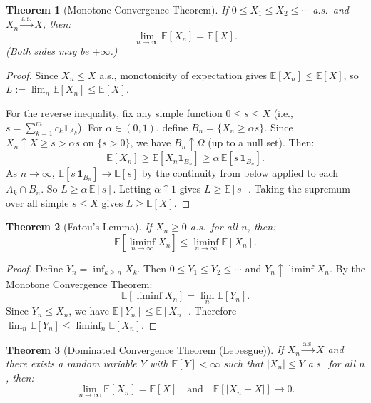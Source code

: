 \documentclass[11pt,a4paper]{article}
\theoremstyle{definition}
\theoremstyle{plain}
\newtheorem{theorem}{Theorem}[section]
\theoremstyle{remark}
\newcommand{\E}{\mathbb{E}}
\newcommand{\indicator}{\mathbf{1}}
\newcommand{\cas}{\xrightarrow{\text{a.s.}}}
\begin{document}
\begin{theorem}[Monotone Convergence Theorem]
\label{thm:mct}
If $0 \leq X_1 \leq X_2 \leq \cdots$ a.s.\ and $X_n \cas X$, then:
\begin{equation}
    \lim_{n \to \infty} \E[X_n] = \E[X].
    \label{eq:mct}
\end{equation}
(Both sides may be $+\infty$.)
\end{theorem}

\begin{proof}
Since $X_n \leq X$ a.s., monotonicity of expectation gives $\E[X_n] \leq \E[X]$, so $L := \lim_n \E[X_n] \leq \E[X]$.

For the reverse inequality, fix any simple function $0 \leq s \leq X$ (i.e., $s = \sum_{k=1}^m c_k \indicator_{A_k}$). For $\alpha \in (0,1)$, define $B_n = \{X_n \geq \alpha s\}$. Since $X_n \uparrow X \geq s > \alpha s$ on $\{s > 0\}$, we have $B_n \uparrow \Omega$ (up to a null set). Then:
\begin{equation}
    \E[X_n] \geq \E[X_n \indicator_{B_n}] \geq \alpha\, \E[s\, \indicator_{B_n}].
\end{equation}
As $n \to \infty$, $\E[s\,\indicator_{B_n}] \to \E[s]$ by the continuity from below applied to each $A_k \cap B_n$. So $L \geq \alpha\,\E[s]$. Letting $\alpha \uparrow 1$ gives $L \geq \E[s]$. Taking the supremum over all simple $s \leq X$ gives $L \geq \E[X]$.
\end{proof}

\begin{theorem}[Fatou's Lemma]
\label{thm:fatou}
If $X_n \geq 0$ a.s.\ for all $n$, then:
\begin{equation}
    \E\!\left[\liminf_{n \to \infty} X_n\right] \leq \liminf_{n \to \infty} \E[X_n].
    \label{eq:fatou}
\end{equation}
\end{theorem}

\begin{proof}
Define $Y_n = \inf_{k \geq n} X_k$. Then $0 \leq Y_1 \leq Y_2 \leq \cdots$ and $Y_n \uparrow \liminf X_n$. By the Monotone Convergence Theorem:
\begin{equation}
    \E[\liminf X_n] = \lim_n \E[Y_n].
\end{equation}
Since $Y_n \leq X_n$, we have $\E[Y_n] \leq \E[X_n]$. Therefore $\lim_n \E[Y_n] \leq \liminf_n \E[X_n]$.
\end{proof}

\begin{keyresult}
\begin{theorem}[Dominated Convergence Theorem (Lebesgue)]
\label{thm:dct}
If $X_n \cas X$ and there exists a random variable $Y$ with $\E[Y] < \infty$ such that $|X_n| \leq Y$ a.s.\ for all $n$, then:
\begin{equation}
    \lim_{n \to \infty} \E[X_n] = \E[X] \quad \text{and} \quad \E[|X_n - X|] \to 0.
    \label{eq:dct}
\end{equation}
\end{theorem}
\end{keyresult}
\end{document}

